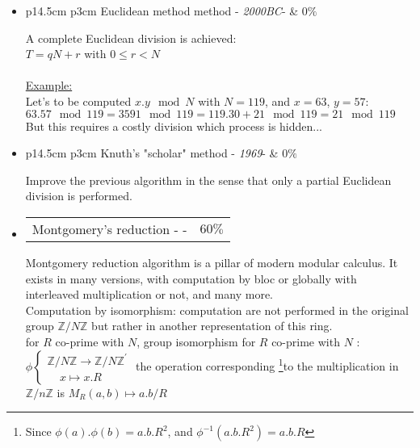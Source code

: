 \begin{itemize}
	\item 
		\begin{tabularx}{\linewidth}{ p{14.5cm} p{3cm} }
		Euclidean method method -
		\textit{2000BC}- & $0\%$ 
	 	\end{tabularx}
	 		A complete Euclidean division is achieved:\\
	 		$ T = q N + r $ with $ 0 \leq r < N$\\\\
			\underline{Example:}\\
			Let's to be computed $x.y \mod N$  with $N = 119$, and $x = 63$, $y = 57$:\\
			$63.57 \mod 119 = 3591 \mod 119 = 119.30+21 \mod 119 = 21 \mod 119$\\
			But this requires a costly division which process is hidden...
		 		 
	\item
		\begin{tabularx}{\linewidth}{ p{14.5cm} p{3cm} }
		Knuth's "scholar" method - \textit{1969}- & $0\%$	  
		\end{tabularx}
		  	Improve the previous algorithm in the sense that only a 
		  	partial Euclidean division is performed.	  	
			
	\item 
		\begin{tabularx}{\linewidth}{ p{14.5cm} p{3cm} }
		Montgomery's reduction - \cite{ieeetc-2005-montgomery} - & $60\%$ \\
		\end{tabularx}
			Montgomery reduction algorithm is a pillar of modern modular calculus.
			It exists in many versions, with computation by bloc or globally
			with interleaved multiplication or not, and many more.\\

			Computation by isomorphism: computation are not performed in the original group 
			$\mathbb{Z}/{N \mathbb{Z}}$ but rather in another 
			representation of this ring.\\
			for $R$ co-prime with $N$, group isomorphism
			for $R$ co-prime with $N$ :
			$
			\phi\left\{
			    \begin{array}{c}
			     \mathbb{Z}/{N \mathbb{Z}} \longrightarrow {\mathbb{Z}/{N \mathbb{Z}}}^{'}  \\
			      \;\;\;\;x \longmapsto x.R
			    \end{array}
			\right.
			$
		    the operation corresponding
		    	    \footnote{
		    	Since $\phi(a).\phi(b) = a.b.R^2$, and  $\phi^{-1}(a.b.R^2)=a.b.R$
		    	}to the multiplication in $\mathbb{Z}/{n \mathbb{Z}}$
		    is $M_R (a,b)\mapsto a.b/R$
	

\end{itemize}
